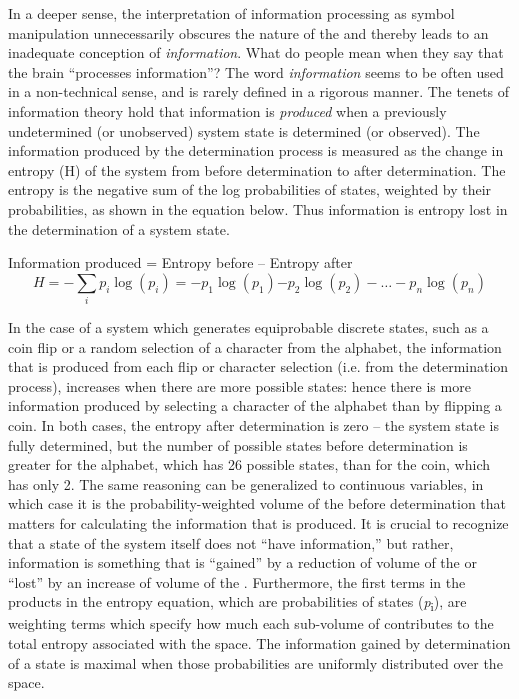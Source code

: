 In a deeper sense, the interpretation of information processing as symbol manipulation unnecessarily obscures the nature of the  and thereby leads to an inadequate conception of \textit{information}. What do people mean when they say that the brain “processes information”? The word \textit{information} seems to be often used in a non-technical sense, and is rarely defined in a rigorous manner. The tenets of information theory \citep{Shannon1948} hold that information is \textit{produced} when a previously undetermined (or unobserved) system state is determined (or observed). The information produced by the determination process is measured as the change in entropy (H) of the system from before determination to after determination. The entropy is the negative sum of the log probabilities of states, weighted by their probabilities, as shown in the equation below. Thus information is entropy lost in the determination of a system state.

\ea
  Information produced = Entropy before – Entropy after
$$
H=-\sum _{i}{{p}_{i}\log \left({p}_{i}\right)={-p}_{1}\log \left({p}_{1}\right){-p}_{2}\log \left({p}_{2}\right)-{\dots}-{p}_{n}\log \text{⁡}\left({p}_{n}\right)}
$$
\z

In the case of a system which generates equiprobable discrete states, such as a coin flip or a random selection of a character from the alphabet, the information that is produced from each flip or character selection (i.e. from the determination process), increases when there are more possible states: hence there is more information produced by selecting a character of the alphabet than by flipping a coin. In both cases, the entropy after determination is zero -- the system state is fully determined, but the number of possible states before determination is greater for the alphabet, which has 26 possible states, than for the coin, which has only 2. The same reasoning can be generalized to continuous variables, in which case it is the probability-weighted volume of the  before determination that matters for calculating the information that is produced. It is crucial to recognize that a state of the system itself does not “have information,” but rather, information is something that is “gained” by a reduction of volume of the  or “lost” by an increase of volume of the . Furthermore, the first terms in the products in the entropy equation, which are probabilities of states (\textit{p}\textsubscript{i}), are weighting terms which specify how much each sub-volume of  contributes to the total entropy associated with the space. The information gained by determination of a state is maximal when those probabilities are uniformly distributed over the space.

